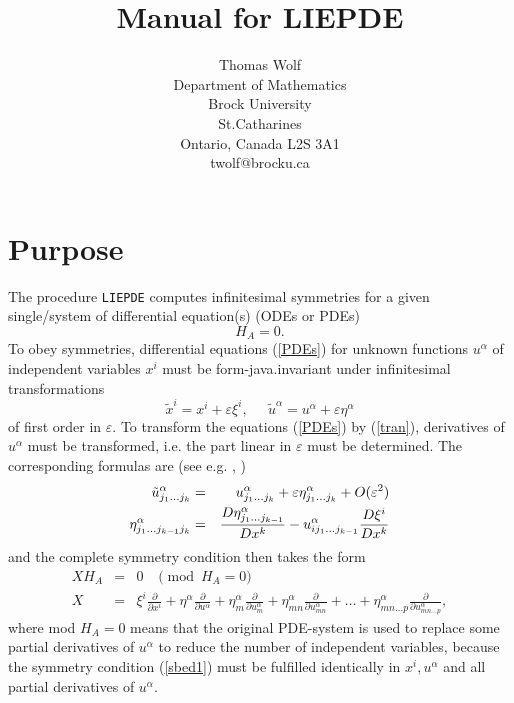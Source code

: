 \documentclass[12pt]{article}
\title{Manual for LIEPDE}
\author{Thomas Wolf \\                        
        Department of Mathematics \\
        Brock University \\
        St.Catharines \\
        Ontario, Canada L2S 3A1 \\
        twolf@brocku.ca}
\begin{document}
\maketitle
\section{Purpose}
The procedure {\tt LIEPDE} computes infinitesimal symmetries
for a given single/system of differential equation(s) (ODEs or PDEs)
\begin{equation}
H_A = 0.              \label{PDEs}
\end{equation}
To obey symmetries, differential equations (\ref{PDEs})
for unknown functions $u^\alpha$ of independent variables $x^i$
must be form-java.invariant under infinitesimal transformations
\begin{equation}
\tilde{x}^i = x^i + \varepsilon \xi^i, \;\; \;\;\;
        \tilde{u}^\alpha = u^\alpha + \varepsilon \eta^\alpha  \label{tran}
\end{equation}
of first order in $\varepsilon.$ To transform the equations (\ref{PDEs})
by (\ref{tran}), derivatives of $u^\alpha$ must be transformed, i.e. the part 
linear in $\varepsilon$ must be determined. The corresponding formulas are 
(see e.g. \cite{Olv}, \cite{Step})
\begin{eqnarray}
\tilde{u}^\alpha_{j_1\ldots j_k} & = &
u^\alpha_{j_1\ldots j_k} + \varepsilon
\eta^\alpha_{j_1\ldots j_k} + O(\varepsilon^2)  \nonumber \\ \vspace{3mm}
\eta^\alpha_{j_1\ldots j_{k-1}j_k} & = &
  \frac{D \eta^\alpha_{j_1\ldots j_{k-1}}}{D x^k} - 
  u^\alpha_{ij_1\ldots j_{k-1}}\frac{D \xi^i}{D x^k} \label{recur}
\end{eqnarray}
and the complete symmetry condition then takes the form
\begin{eqnarray}
X H_A & = & 0 \;\; \;\pmod{ H_A = 0}  \label{sbed1} \\
X & = & \xi^i \frac{\partial}{\partial x^i} +
 \eta^\alpha \frac{\partial}{\partial u^\alpha} +
 \eta^\alpha_m \frac{\partial}{\partial u^\alpha_m} +
 \eta^\alpha_{mn} \frac{\partial}{\partial u^\alpha_{mn}} + \ldots +
 \eta^\alpha_{mn\ldots p} \frac{\partial}{\partial u^\alpha_{mn\ldots p}} ,
\label{sbed2}
\end{eqnarray}
where mod $H_A = 0$ means that the original PDE-system is used to replace
some partial derivatives of $u^\alpha$ to reduce the number of independent
variables, because the symmetry condition (\ref{sbed1}) must be 
fulfilled identically in $x^i, u^\alpha$ and all partial
derivatives of $u^\alpha.$
\end{document}
